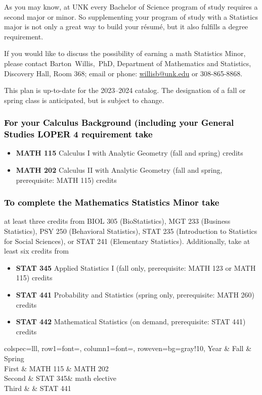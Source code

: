 \documentclass[10pt]{article}
\makeatletter
\newcommand{\calcone}{\textbf{MATH 115} Calculus I with Analytic Geometry (fall and spring) \dotfill 5 credits}
\newcommand{\calconeshort}{MATH 115}
\newcommand{\calctwo}{\textbf{MATH 202} Calculus II with Analytic Geometry (fall and spring, prerequisite: MATH 115) \dotfill 5 credits }
\newcommand{\calctwoshort}{MATH 202}
\newcommand{\statistics}{\textbf{STAT 441} Probability and Statistics (spring only, prerequisite: MATH 260)  \dotfill  3 credits}
\newcommand{\statisticsshort}{STAT 441}
\newcommand{\statisticsII}{\textbf{STAT 442} Mathematical Statistics   (on demand, prerequisite: STAT 441)  \dotfill  3 credits}
\newcommand{\appliedstat}{\textbf{STAT 345} Applied Statistics I (fall only, prerequisite: MATH 123 or MATH 115) \dotfill 3 credits}
\newcommand{\appliedstatshort}{STAT 345}
\newcommand{\contactbw}{\mbox{Barton Willis, PhD}, Department of Mathematics and Statistics,  Discovery Hall, Room 368;
email or phone: \href{mailto:willisb@unk.edu}{willisb@unk.edu} or 308-865-8868.}
\newcommand{\forinfo}[2]{If you would like to discuss the possibility of earning a math {#1}, please contact \contactbw}
\newcommand{\catalog}{2023--2024 }
\newcommand{\LOPER}{LOPER\xspace}
\newcommand{\uptodate}{This plan is up-to-date for  the \catalog catalog. The designation of a fall or spring class is 
anticipated, but  is subject to change.}
\newcommand{\statMinor}{
 \begin{table}[ht]
  \caption*{Suggested Statistics Minor program of study}
\center
  \begin{tblr}{
      colspec={lll},
      row{1}={font=\bfseries},
      column{1}={font=\itshape},
      row{even}={bg=gray!10},
    }
      Year        & Fall  & Spring   \\
    \toprule    
            First & \calconeshort{}  & \calctwoshort \\ 
            Second &  \appliedstatshort &  math elective \\ 
            Third &           &  \statisticsshort \\
       \bottomrule
  \end{tblr}
\end{table}}
\makeatother
\begin{document}
As you may know, at UNK every Bachelor of Science program of study requires a second
major or minor. So supplementing your  program of study with a Statistics major is not only a great
way to build your r\'esum\'e, but it also fulfills a degree requirement.

\forinfo{Statistics Minor}{}

\uptodate

\vspace{-0.1in}

\subsubsection*{\textcolor{black}{For your Calculus Background (including your General Studies \LOPER 4 requirement take}}
\begin{itemize}
\item  \calcone
\item \calctwo
\end{itemize}

\subsubsection*{\textcolor{black}{To complete the Mathematics Statistics Minor take}}

at least three credits from BIOL 305 (BioStatistics), MGT 233 (Business Statistics), PSY 250 (Behavioral Statistics),
STAT 235 (Introduction to Statistics for Social Sciences), or STAT 241 (Elementary Statistics).   Additionally, take 
at least six credits from  
\begin{itemize}
\item \appliedstat
\item \statistics
\item \statisticsII
\end{itemize}
\statMinor
\end{document}
